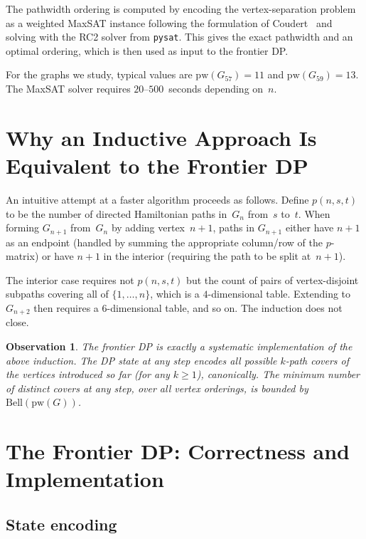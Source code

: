 \documentclass[12pt]{article}
\newtheorem{observation}[theorem]{Observation}
\theoremstyle{definition}
\newcommand{\Gn}{G_n}
\newcommand{\pw}{\mathrm{pw}}
\newcommand{\Bell}{\mathrm{Bell}}
\begin{document}
The pathwidth ordering is computed by encoding the vertex-separation problem as
a weighted MaxSAT instance following the formulation of
Coudert~\cite{Coudert} and solving with the RC2 solver from
\texttt{pysat}.
This gives the exact pathwidth and an optimal ordering, which is then used as
input to the frontier DP.

For the graphs we study, typical values are $\pw(G_{57}) = 11$ and
$\pw(G_{59}) = 13$.
The MaxSAT solver requires $20$--$500$~seconds depending on~$n$.

\section{Why an Inductive Approach Is Equivalent to the Frontier DP}
\label{sec:induction}

An intuitive attempt at a faster algorithm proceeds as follows.
Define $p(n,s,t)$ to be the number of directed Hamiltonian paths in~$\Gn$
from~$s$ to~$t$.
When forming $G_{n+1}$ from~$G_n$ by adding vertex~$n+1$, paths in
$G_{n+1}$ either have $n+1$ as an endpoint (handled by summing the
appropriate column/row of the $p$-matrix) or have $n+1$ in the interior
(requiring the path to be split at~$n+1$).

The interior case requires not $p(n,s,t)$ but the count of pairs of
vertex-disjoint subpaths covering all of $\{1,\ldots,n\}$, which is a
$4$-dimensional table.
Extending to $G_{n+2}$ then requires a $6$-dimensional table, and so on.
The induction does not close.

\begin{observation}
The frontier DP is exactly a systematic implementation of the above induction.
The DP state at any step encodes all possible $k$-path covers of the vertices
introduced so far (for any $k \ge 1$), canonically.
The minimum number of distinct covers at any step, over all vertex orderings,
is bounded by $\Bell(\pw(G))$.
\end{observation}

\section{The Frontier DP: Correctness and Implementation}
\label{sec:dp}

\subsection{State encoding}
\end{document}
